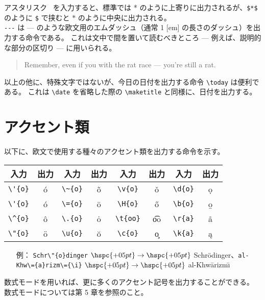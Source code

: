 アスタリスク \textasteriskcentered\ を入力すると、標準では * のように上寄りに出力されるが、\verb'$*$' のように \verb'$' で挟むと $*$ のように中央に出力される。\\

\verb'---' は --- のような欧文用のエムダッシュ（通常 1 [em] の長さのダッシュ）を出力する命令である。
これは文中で間を置いて読むべきところ --- 例えば、説明的な部分の区切り --- に用いられる。
\begin{quote}
  Remember, even if you with the rat race --- you're still a rat.
\end{quote}
以上の他に、特殊文字ではないが、今日の日付を出力する命令 \verb'\today' は便利である。
これは \verb'\date' を省略した際の \verb'\maketitle' と同様に、日付を出力する。
\section{アクセント類}
以下に、欧文で使用する種々のアクセント類を出力する命令を示す。\enlargethispage{+3.00zw}
\begin{longtable}{@{}cccccccc@{}}
    入力         & 出力  & 入力          & 出力   & 入力          & 出力   & 入力         & 出力  \\ \toprule
    \verb|\'{o}| & \'{o} & \verb|\~{o}|  & \~{o}  & \verb|\v{o}|  & \v{o}  & \verb|\d{o}| & \d{o} \\
    \verb|\'{o}| & \'{o} & \verb|\={o}|  & \={o}  & \verb|\H{o}|  & \H{o}  & \verb|\b{o}| & \b{o} \\
    \verb|\^{o}| & \^{o} & \verb|\.{o}|  & \.{o}  & \verb|\t{oo}| & \t{oo} & \verb|\r{a}| & \r{a} \\
    \verb|\"{o}| & \"{o} & \verb|\u{o}|  & \u{o}  & \verb|\c{o}|  & \c{o}  & \verb|\k{a}| & \k{a} \\
\end{longtable}
\begin{itemize}\setlength{\leftskip}{0.20zw}%
\item[例：] \verb|Schr\"{o}dinger| $\hspc{+05pt}\rightarrow\hspc{+05pt}$ Schr\"{o}dinger、\verb|al-Khw\={a}rizm\={\i}| $\hspc{+05pt}\rightarrow\hspc{+05pt}$ al-Khw\={a}rizm\={\i}
\end{itemize}
数式モードを用いれば、更に多くのアクセント記号を出力することができる。
数式モードについては第 5 章を参照のこと。
